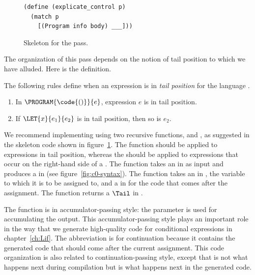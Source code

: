 \documentclass[7x10]{TimesAPriori_MIT}%
\numberwithin{theorem}{chapter}
\numberwithin{definition}{chapter}
\numberwithin{equation}{chapter}
\begin{document}
{\begin{figure}[tbp]
\begin{tcolorbox}[colback=white]
\begin{lstlisting}
(define (explicate_control p)
  (match p
    [(Program info body) ___]))
\end{lstlisting}
\end{tcolorbox}
\caption{Skeleton for the  pass.}
\label{fig:explicate-control-Lvar}
\end{figure}

The organization of this pass depends on the notion of tail position
to which we have alluded. Here is the definition.

\begin{definition}\normalfont
  The following rules define when an expression is in \emph{tail
  position} for the language \LangVar{}.
\begin{enumerate}
\item In $\PROGRAM{\code{()}}{e}$, expression $e$ is in tail position.
\item If $\LET{x}{e_1}{e_2}$ is in tail position, then so is $e_2$.
\end{enumerate}
\end{definition}

We recommend implementing  using two
recursive functions,  and
, as suggested in the skeleton code shown in
figure~\ref{fig:explicate-control-Lvar}.  The 
function should be applied to expressions in tail position, whereas the
 should be applied to expressions that occur on
the right-hand side of a .
%
The  function takes an \Exp{} in \LangVar{} as
input and produces a \Tail{} in \LangCVar{} (see
figure~\ref{fig:c0-syntax}).
%
The  function takes an \Exp{} in \LangVar{},
the variable to which it is to be assigned to, and a \Tail{} in
\LangCVar{} for the code that comes after the assignment.  The
 function returns a $\Tail$ in \LangCVar{}.

The  function is in accumulator-passing style:
the  parameter is used for accumulating the output. This
accumulator-passing style plays an important role in the way that we
generate high-quality code for conditional expressions in
chapter~\ref{ch:Lif}.  The abbreviation  is for
continuation because it contains the generated code that should come
after the current assignment.  This code organization is also related
to continuation-passing style, except that  is not what
happens next during compilation but is what happens next in the
generated code.

}
\end{document}
